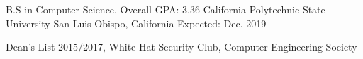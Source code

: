 


\begin{cventries}


\cventry
{B.S in Computer Science, Overall GPA: 3.36} %
{California Polytechnic State University} %
{San Luis Obispo, California} %
{Expected: Dec. 2019} %
{ %
\begin{cvitems}
\item {Dean's List 2015/2017, White Hat Security Club, Computer Engineering Society }
\end{cvitems}
}


\end{cventries}
